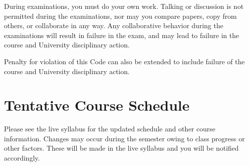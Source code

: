 \documentclass[a4paper]{article}
\begin{document}
During examinations, you must do your own work. Talking or discussion is not permitted during the examinations, nor may you compare papers, copy from others, or collaborate in any way. Any collaborative behavior during the examinations will result in failure in the exam, and may lead to failure in the course and University disciplinary action.

Penalty for violation of this Code can also be extended to include failure of the course and University disciplinary action. 
\section{Tentative Course Schedule}

Please see the live syllabus for the updated schedule and other course information. Changes may occur during the semester owing to class progress or other factors. These will be made in the live syllabus and you will be notified accordingly.
\end{document}
